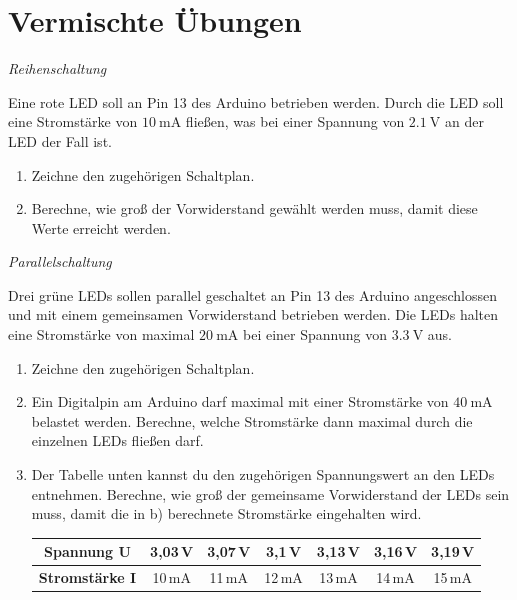 \section{Vermischte Übungen}

\begin{aufgabe} \emph{Reihenschaltung}
	
	Eine rote LED soll an Pin 13 des Arduino betrieben werden. Durch die LED soll eine Stromstärke von $\SI{10}{\milli\ampere}$ fließen, was bei einer Spannung von $\SI{2,1}{\volt}$ an der LED der Fall ist. 
	\begin{enumerate}[label=\alph*), itemsep=0ex]
		\item Zeichne den zugehörigen Schaltplan.
		\item Berechne, wie groß der Vorwiderstand gewählt werden muss, damit diese Werte erreicht werden.
	\end{enumerate}
\end{aufgabe}

\begin{aufgabe} \emph{Parallelschaltung}
	
	Drei grüne LEDs sollen parallel geschaltet an Pin 13 des Arduino angeschlossen und mit einem gemeinsamen Vorwiderstand betrieben werden. Die LEDs halten eine Stromstärke von maximal $\SI{20}{\milli\ampere}$ bei einer Spannung von $\SI{3,3}{\volt}$ aus.
	
	\begin{enumerate}[label=\alph*), itemsep=0ex]
		\item Zeichne den zugehörigen Schaltplan.
		\item Ein Digitalpin am Arduino darf maximal mit einer Stromstärke von $\SI{40}{\milli\ampere}$ belastet werden. Berechne, welche Stromstärke dann maximal durch die einzelnen LEDs fließen darf.
		\item Der Tabelle unten kannst du den zugehörigen Spannungswert an den LEDs entnehmen. Berechne, wie groß der gemeinsame Vorwiderstand der LEDs sein muss, damit die in b) berechnete Stromstärke eingehalten wird.
		
		\begin{tabular}{c | c | c | c | c | c | c}
			\hline
			\textbf{Spannung U} & 3,03\,V & 3,07\,V & 3,1\,V & 3,13\,V & 3,16\,V & 3,19\,V \\ \hline
			\textbf{Stromstärke I} & 10\,mA & 11\,mA & 12\,mA & 13\,mA & 14\,mA & 15\,mA  \\ \hline
		\end{tabular}
	\end{enumerate}
\end{aufgabe}

